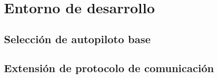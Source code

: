 \chapter{Entorno de desarrollo}

\section{Selección de autopiloto base}

\section{Extensión de protocolo de comunicación}

